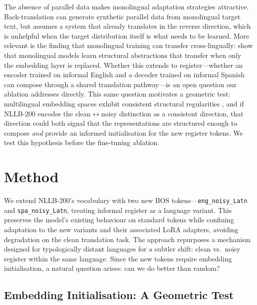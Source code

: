 \documentclass[11pt]{article}
\begin{document}
The absence of parallel data makes monolingual adaptation strategies attractive.
Back-translation \citep{sennrich2016backtranslation, edunov2018backtranslation}
can generate synthetic parallel data from monolingual target text, but assumes
a system that already translates in the reverse direction, which is unhelpful when the
target distribution itself is what needs to be learned. More relevant is the
finding that monolingual training can transfer cross-lingually:
\citet{artetxe2020crosslingual} show that monolingual models learn structural
abstractions that transfer when only the embedding layer is replaced. Whether
this extends to register---whether an encoder trained on informal English and a
decoder trained on informal Spanish can compose through a shared translation
pathway---is an open question our ablation addresses directly. This same
question motivates a geometric test: multilingual embedding spaces exhibit
consistent structural regularities \citep{mikolov2013linguistic,
artetxe2018robust, cai2022geometry, subramanian2022extracting}, and if
NLLB-200 encodes the clean$\leftrightarrow$noisy distinction as a consistent
direction, that direction could both signal that the representations are
structured enough to compose \emph{and} provide an informed initialisation for
the new register tokens. We test this hypothesis before the fine-tuning
ablation.


\section{Method}
\label{sec:method}
\sloppy


We extend NLLB-200's vocabulary with two new BOS
tokens---\texttt{eng\_noisy\_Latn} and
\texttt{spa\_noisy\_Latn}, treating informal register as a
language variant. This preserves the model's existing
behaviour on standard tokens while confining adaptation to
the new variants and their associated LoRA adapters, avoiding
degradation on the clean translation task. The approach
repurposes a mechanism designed for typologically distant
languages \citep{berard-2021-continual, kamau-2025-challenge}
for a subtler shift: clean vs.\ noisy register within the
same language. Since the new tokens require embedding
initialisation, a natural question arises: can we do better
than random?


\subsection{Embedding Initialisation: A Geometric Test}
\label{sec:analysis}
\end{document}

